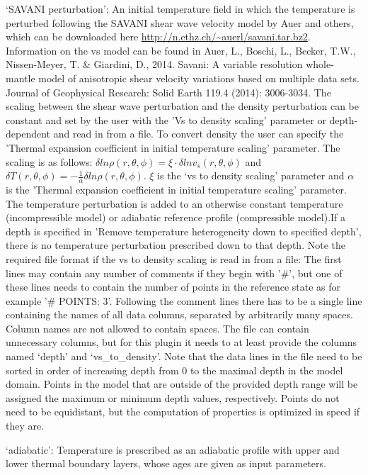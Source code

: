 \begin{itemize}
`SAVANI perturbation': An initial temperature field in which the temperature is perturbed following the SAVANI shear wave velocity model by Auer and others, which can be downloaded here \url{http://n.ethz.ch/~auerl/savani.tar.bz2}. Information on the vs model can be found in Auer, L., Boschi, L., Becker, T.W., Nissen-Meyer, T. \& Giardini, D., 2014. Savani: A variable resolution whole-mantle model of anisotropic shear velocity variations based on multiple data sets. Journal of Geophysical Research: Solid Earth 119.4 (2014): 3006-3034. The scaling between the shear wave perturbation and the density perturbation can be constant and set by the user with the 'Vs to density scaling' parameter or depth-dependent and read in from a file. To convert density the user can specify the 'Thermal expansion coefficient in initial temperature scaling' parameter. The scaling is as follows: $\delta ln \rho (r,\theta,\phi) = \xi \cdot \delta ln v_s(r,\theta, \phi)$ and $\delta T(r,\theta,\phi) = - \frac{1}{\alpha} \delta ln \rho(r,\theta,\phi)$. $\xi$ is the `vs to density scaling' parameter and $\alpha$ is the 'Thermal expansion coefficient in initial temperature scaling' parameter. The temperature perturbation is added to an otherwise constant temperature (incompressible model) or adiabatic reference profile (compressible model).If a depth is specified in 'Remove temperature heterogeneity down to specified depth', there is no temperature perturbation prescribed down to that depth.
Note the required file format if the vs to density scaling is read in from a file: The first lines may contain any number of comments if they begin with '#', but one of these lines needs to contain the number of points in the reference state as for example '# POINTS: 3'. Following the comment lines there has to be a single line containing the names of all data columns, separated by arbitrarily many spaces. Column names are not allowed to contain spaces. The file can contain unnecessary columns, but for this plugin it needs to at least provide the columns named `depth' and `vs\_to\_density'. Note that the data lines in the file need to be sorted in order of increasing depth from 0 to the maximal depth in the model domain. Points in the model that are outside of the provided depth range will be assigned the maximum or minimum depth values, respectively. Points do not need to be equidistant, but the computation of properties is optimized in speed if they are.

`adiabatic': Temperature is prescribed as an adiabatic profile with upper and lower thermal boundary layers, whose ages are given as input parameters.


\end{itemize}
